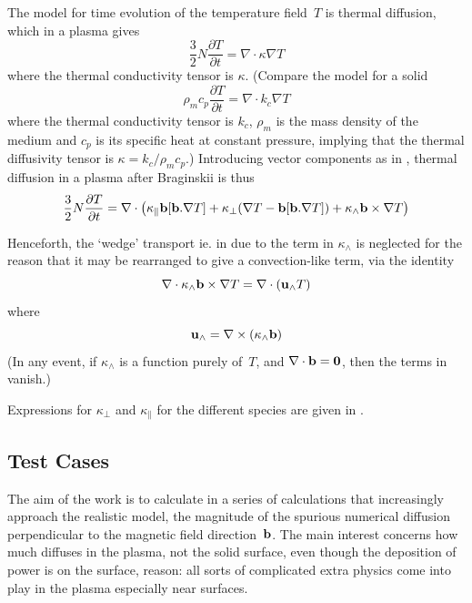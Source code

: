 The model for time evolution of the temperature field~$T$ is thermal diffusion,
which in a plasma gives
\begin{equation}\label{eq:plas2diff}
\frac{3}{2} N \frac{\partial T}{\partial t}=\nabla \cdot \kappa \nabla T
\end{equation}
where the thermal conductivity tensor is $\kappa$.
(Compare the model for a solid
\begin{equation}\label{eq:solidiff}
\rho_m c_p \frac{\partial T}{\partial t}=\nabla \cdot k_c \nabla T
\end{equation}
where the thermal conductivity tensor is $k_c$, $\rho_m$ is the mass density of the medium 
and $c_p$ is its specific heat at constant pressure, implying
that the thermal diffusivity tensor is $\kappa=k_c/\rho_m c_p$.)
Introducing vector components as  in ,
thermal diffusion in a plasma after Braginskii is thus
\begin{equation}\label{eq:plas2brag}
\frac{3}{2} N \frac{\partial T}{\partial t}=
\nabla \cdot \left(
\kappa_{\parallel} {\bf b} [{\bf b}.\nabla T] +
\kappa_{\perp} (\nabla T - {\bf b} [{\bf b}.\nabla T])+
\kappa_{\wedge} {\bf b} \times \nabla T
\right) 
\end{equation}

Henceforth, the `wedge' transport ie. in due to the term in $\kappa_{\wedge}$
is neglected for the reason that it may be rearranged to give
a convection-like term, via the identity 
\begin{equation}\label{eq:crossxp}
\nabla \cdot \kappa_\wedge {\bf b} \times \nabla T = \nabla \cdot ({\bf u}_\wedge  T)
\end{equation}
where
\begin{equation}\label{eq:uxp}
{\bf u}_\wedge = \nabla \times (\kappa_\wedge {\bf b})
\end{equation}
(In any event, if $\kappa_\wedge$ is a function purely of~$T$, and
$\nabla \cdot {\bf b}=\bf{0}$, then the terms in  vanish.)

Expressions for $\kappa_{\perp}$ and $\kappa_{\parallel}$ for the different species
are given in .

\subsection{Test Cases}\label{sec:tests}
The aim of the work is to calculate in a series of calculations that increasingly
approach the realistic model, the magnitude of the spurious numerical diffusion
perpendicular to the magnetic field direction~${\bf b}$. The main interest concerns
how much diffuses in the plasma, not the solid surface, even though the deposition
of power is on the surface, reason: all sorts of complicated extra physics come
into play in the plasma especially near surfaces.
